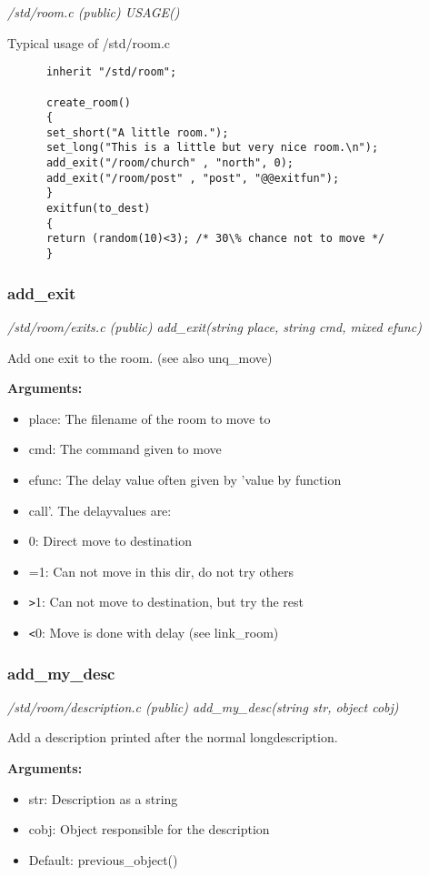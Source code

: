 {\em /std/room.c (public) USAGE()}

Typical usage of /std/room.c

\begin{verbatim}
      inherit "/std/room";

      create_room()
      {
      set_short("A little room.");
      set_long("This is a little but very nice room.\n");
      add_exit("/room/church" , "north", 0);
      add_exit("/room/post" , "post", "@@exitfun");
      }
      exitfun(to_dest)
      {
      return (random(10)<3); /* 30\% chance not to move */
      }
\end{verbatim}

\subsubsection{add\_exit}

{\em /std/room/exits.c (public) add\_exit(string place, string cmd, mixed efunc)}

Add one exit to the room. (see also unq\_move)

{\bf Arguments:}
\begin{itemize}
\item     place: The filename of the room to move to
\item cmd:   The command given to move
\item efunc: The delay value often given by 'value by function
\item call'. The delayvalues are:
\item 0: Direct move to destination
\item =1: Can not move in this dir, do not try others
\item \verb+>+1: Can not move to destination, but try the rest
\item \verb+<+0: Move is done with delay (see link\_room)
\end{itemize}


\subsubsection{add\_my\_desc}

{\em /std/room/description.c (public) add\_my\_desc(string str, object cobj)}

Add a description printed after the normal
longdescription.

{\bf Arguments:}
\begin{itemize}
\item       str: Description as a string
\item cobj: Object responsible for the description
\item Default: previous\_object()
\end{itemize}


